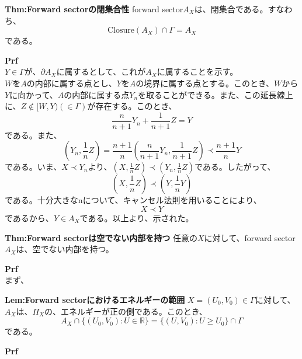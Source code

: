 \documentclass[a4paper,11pt]{jsarticle}
\numberwithin{equation}{section}
\begin{document}
\begin{itembox}[l]{\textbf{Thm:Forward sectorの閉集合性}}
forward sector$A_X$は、閉集合である。すなわち、
\begin{equation}
   \mathrm{Closure}(A_X) \cap \Gamma = A_X
\end{equation}
である。
\end{itembox}
\textbf{Prf}\\
$Y \in \Gamma$が、$\partial A_X$に属するとして、これが$A_X$に属することを示す。\\
$W$を$A$の内部に属する点とし、$Y$を$A$の境界に属する点とする。このとき、$W$から$Y$に向かって、$A$の内部に属する点$Y_n$を取ることができる。また、この延長線上に、$Z \notin [W,Y)(\in \Gamma)$が存在する。このとき、
\begin{equation}
    \frac{n}{n+1}Y_n + \frac{1}{n+1}Z=Y 
\end{equation}
である。また、
\begin{equation}
    (Y_n,\frac{1}{n}Z) =\frac{n+1}{n}(\frac{n}{n+1}Y_n,\frac{1}{n+1}Z) \prec \frac{n+1}{n}Y
\end{equation}
である。いま、$X\prec Y_n$より、$(X,\frac{1}{n}Z) \prec (Y_n,\frac{1}{n}Z)$である。したがって、
\begin{equation}
    (X,\frac{1}{n}Z) \prec (Y,\frac{1}{n}Y)
\end{equation}
である。十分大きなnについて、キャンセル法則を用いることにより、
\begin{equation}
    X \prec Y
\end{equation}
であるから、$Y \in A_X$である。以上より、示された。\hfill\qedsymbol\\

\begin{itembox}[l]{\textbf{Thm:Forward sectorは空でない内部を持つ}}
任意の$X$に対して、forward sector$A_X$は、空でない内部を持つ。
\end{itembox}
\textbf{Prf}\\
まず、

\begin{itembox}[l]{\textbf{Lem:Forward sectorにおけるエネルギーの範囲}}
    $X=(U_0,V_0) \in \Gamma$に対して、$A_X$は、$\Pi_X$の、エネルギーが正の側である。このとき、
    \begin{equation}
        A_X \cap \{(U_0,V_0):U \in \mathbb{R}\}=\{(U,V_0):U \geq U_0\}\cap \Gamma
    \end{equation}
    である。
\end{itembox}
\textbf{Prf}\\
\end{document}
